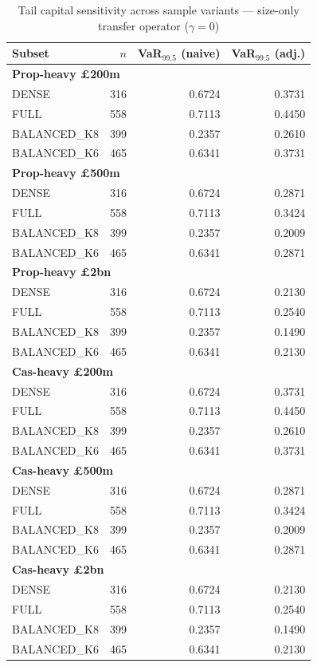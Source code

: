\begin{table}[htbp]
\centering
\caption{Tail capital sensitivity across sample variants --- size-only transfer operator ($\gamma=0$)}
\label{tab:tail_capital_sensitivity}
\begin{tabular}{lrrr}
\toprule
\textbf{Subset} & \textbf{$n$} & \textbf{VaR$_{99.5}$ (naive)} & \textbf{VaR$_{99.5}$ (adj.)} \\
\midrule
\multicolumn{4}{l}{\textbf{Prop-heavy £200m}} \\
\midrule
DENSE & 316 & 0.6724 & 0.3731 \\
FULL & 558 & 0.7113 & 0.4450 \\
BALANCED_K8 & 399 & 0.2357 & 0.2610 \\
BALANCED_K6 & 465 & 0.6341 & 0.3731 \\
\midrule
\multicolumn{4}{l}{\textbf{Prop-heavy £500m}} \\
\midrule
DENSE & 316 & 0.6724 & 0.2871 \\
FULL & 558 & 0.7113 & 0.3424 \\
BALANCED_K8 & 399 & 0.2357 & 0.2009 \\
BALANCED_K6 & 465 & 0.6341 & 0.2871 \\
\midrule
\multicolumn{4}{l}{\textbf{Prop-heavy £2bn}} \\
\midrule
DENSE & 316 & 0.6724 & 0.2130 \\
FULL & 558 & 0.7113 & 0.2540 \\
BALANCED_K8 & 399 & 0.2357 & 0.1490 \\
BALANCED_K6 & 465 & 0.6341 & 0.2130 \\
\midrule
\multicolumn{4}{l}{\textbf{Cas-heavy £200m}} \\
\midrule
DENSE & 316 & 0.6724 & 0.3731 \\
FULL & 558 & 0.7113 & 0.4450 \\
BALANCED_K8 & 399 & 0.2357 & 0.2610 \\
BALANCED_K6 & 465 & 0.6341 & 0.3731 \\
\midrule
\multicolumn{4}{l}{\textbf{Cas-heavy £500m}} \\
\midrule
DENSE & 316 & 0.6724 & 0.2871 \\
FULL & 558 & 0.7113 & 0.3424 \\
BALANCED_K8 & 399 & 0.2357 & 0.2009 \\
BALANCED_K6 & 465 & 0.6341 & 0.2871 \\
\midrule
\multicolumn{4}{l}{\textbf{Cas-heavy £2bn}} \\
\midrule
DENSE & 316 & 0.6724 & 0.2130 \\
FULL & 558 & 0.7113 & 0.2540 \\
BALANCED_K8 & 399 & 0.2357 & 0.1490 \\
BALANCED_K6 & 465 & 0.6341 & 0.2130 \\
\bottomrule
\end{tabular}
\end{table}
